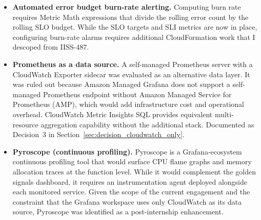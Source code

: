 \begin{itemize}
    \item \textbf{Automated error budget burn-rate alerting.} Computing
          burn rate requires Metric Math expressions that divide the
          rolling error count by the rolling SLO budget. While the SLO
          targets and SLI metrics are now in place, configuring
          burn-rate alarms requires additional CloudFormation work that
          I descoped from IISS-487.

    \item \textbf{Prometheus as a data source.} A self-managed Prometheus
          server with a CloudWatch Exporter sidecar was evaluated as an
          alternative data layer. It was ruled out because Amazon Managed
          Grafana does not support a self-managed Prometheus endpoint
          without Amazon Managed Service for Prometheus (AMP), which
          would add infrastructure cost and operational overhead.
          CloudWatch Metric Insights SQL provides equivalent
          multi-resource aggregation capability without the additional
          stack. Documented as Decision~3 in
          Section~\ref{sec:decision_cloudwatch_only}.

    \item \textbf{Pyroscope (continuous profiling).} Pyroscope is a
          Grafana-ecosystem continuous profiling tool that would surface
          CPU flame graphs and memory allocation traces at the function
          level. While it would complement the golden signals dashboard,
          it requires an instrumentation agent deployed alongside each
          monitored service. Given the scope of the current engagement
          and the constraint that the Grafana workspace uses only
          CloudWatch as its data source, Pyroscope was identified as a
          post-internship enhancement.
\end{itemize}